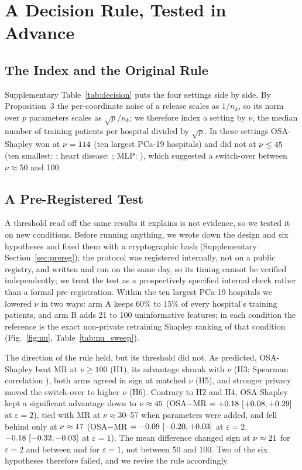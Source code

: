 

\section{A Decision Rule, Tested in Advance}
\label{sec:rule}
\subsection{The Index and the Original Rule}
Supplementary Table~\ref{tab:decision} puts the four settings side by side. By Proposition~3 the per-coordinate noise of a release scales as $1/n_k$, so its norm over $p$ parameters scales as $\sqrt p/n_k$; we therefore index a setting by $\nu$, the median number of training patients per hospital divided by $\sqrt p$. In these settings OSA-Shapley won at $\nu=114$ (ten largest PCa-19 hospitals) and did not at $\nu\le45$ (ten smallest: \nuSmall; heart disease: \nuHeart; MLP: \nuMlp), which suggested a switch-over between $\nu\approx50$ and 100.

\subsection{A Pre-Registered Test}
A threshold read off the same results it explains is not evidence, so we tested it on new conditions. Before running anything, we wrote down the design and six hypotheses and fixed them with a cryptographic hash (Supplementary Section~\ref{sec:prereg}); the protocol was registered internally, not on a public registry, and written and run on the same day, so its timing cannot be verified independently; we treat the test as a prospectively specified internal check rather than a formal pre-registration. Within the ten largest PCa-19 hospitals we lowered $\nu$ in two ways: arm A keeps 60\% to 15\% of every hospital's training patients, and arm B adds 21 to 100 uninformative features; in each condition the reference is the exact non-private retraining Shapley ranking of that condition (Fig.~\ref{fig:nu}, Table~\ref{tab:nu_sweep}).

The direction of the rule held, but its threshold did not. As predicted, OSA-Shapley beat MR at $\nu\ge100$ (H1), its advantage shrank with $\nu$ (H3; Spearman correlation \nsSpear{}), both arms agreed in sign at matched $\nu$ (H5), and stronger privacy moved the switch-over to higher $\nu$ (H6). Contrary to H2 and H4, OSA-Shapley kept a significant advantage down to $\nu\approx45$ (OSA$-$MR $=+0.18\ [+0.08, +0.29]$ at $\varepsilon=2$), tied with MR at $\nu\approx30$--57 when parameters were added, and fell behind only at $\nu\approx17$ (OSA$-$MR $=-0.09\ [-0.20, +0.03]$ at $\varepsilon=2$, $-0.18\ [-0.32, -0.03]$ at $\varepsilon=1$). The mean difference changed sign at $\nu\approx21$ for $\varepsilon=2$ and between \nsCrossOneMin{} and \nsCrossOneMax{} for $\varepsilon=1$, not between 50 and 100. Two of the six hypotheses therefore failed, and we revise the rule accordingly.

